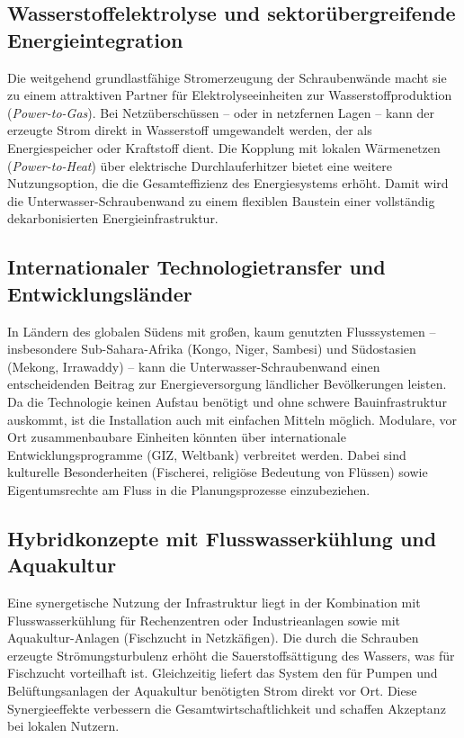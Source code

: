 ﻿\documentclass[a4paper,12pt]{article}
\theoremstyle{definition}
\begin{document}
\subsection{Wasserstoffelektrolyse und sektorübergreifende Energieintegration}

Die weitgehend grundlastfähige Stromerzeugung der Schraubenwände macht sie zu einem
attraktiven Partner für Elektrolyseeinheiten zur Wasserstoffproduktion (\emph{Power-to-Gas}).
Bei Netzüberschüssen -- oder in netzfernen Lagen -- kann der erzeugte Strom direkt
in Wasserstoff umgewandelt werden, der als Energiespeicher oder Kraftstoff dient.
Die Kopplung mit lokalen Wärmenetzen (\emph{Power-to-Heat}) über elektrische
Durchlauferhitzer bietet eine weitere Nutzungsoption, die die Gesamteffizienz des
Energiesystems erhöht. Damit wird die Unterwasser-Schraubenwand zu einem flexiblen
Baustein einer vollständig dekarbonisierten Energieinfrastruktur.

\subsection{Internationaler Technologietransfer und Entwicklungsländer}

In Ländern des globalen Südens mit großen, kaum genutzten Flusssystemen --
insbesondere Sub-Sahara-Afrika (Kongo, Niger, Sambesi) und Südostasien (Mekong,
Irrawaddy) -- kann die Unterwasser-Schraubenwand einen entscheidenden Beitrag
zur Energieversorgung ländlicher Bevölkerungen leisten. Da die Technologie
keinen Aufstau benötigt und ohne schwere Bauinfrastruktur auskommt, ist die
Installation auch mit einfachen Mitteln möglich. Modulare, vor Ort zusammenbaubare
Einheiten könnten über internationale Entwicklungsprogramme (GIZ, Weltbank)
verbreitet werden. Dabei sind kulturelle Besonderheiten (Fischerei, religiöse
Bedeutung von Flüssen) sowie Eigentumsrechte am Fluss in die Planungsprozesse
einzubeziehen.

\subsection{Hybridkonzepte mit Flusswasserkühlung und Aquakultur}

Eine synergetische Nutzung der Infrastruktur liegt in der Kombination mit
Flusswasserkühlung für Rechenzentren oder Industrieanlagen sowie mit
Aquakultur-Anlagen (Fischzucht in Netzkäfigen). Die durch die Schrauben
erzeugte Strömungsturbulenz erhöht die Sauerstoffsättigung des Wassers,
was für Fischzucht vorteilhaft ist. Gleichzeitig liefert das System den für
Pumpen und Belüftungsanlagen der Aquakultur benötigten Strom direkt vor Ort.
Diese Synergieeffekte verbessern die Gesamtwirtschaftlichkeit und schaffen
Akzeptanz bei lokalen Nutzern.
\end{document}
